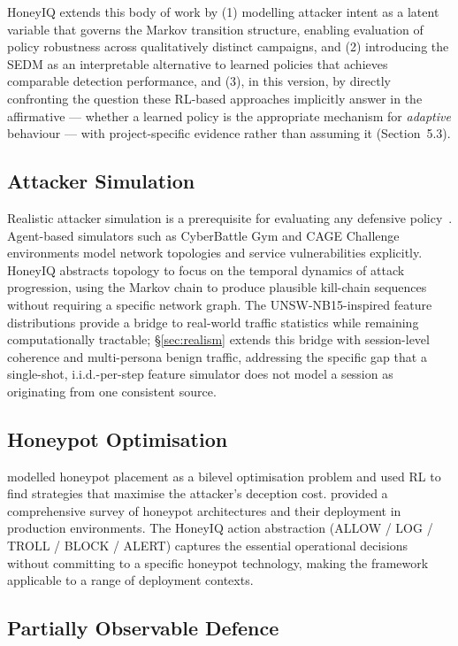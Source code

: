 HoneyIQ extends this body of work by (1) modelling attacker intent as a
latent variable that governs the Markov transition structure, enabling
evaluation of policy robustness across qualitatively distinct campaigns, and
(2) introducing the SEDM as an interpretable alternative to learned policies
that achieves comparable detection performance, and (3), in this version, by
directly confronting the question these RL-based approaches implicitly
answer in the affirmative --- whether a learned policy is the appropriate
mechanism for \emph{adaptive} behaviour --- with project-specific evidence
rather than assuming it (Section~5.3).

\subsection{Attacker Simulation}

Realistic attacker simulation is a prerequisite for evaluating any defensive
policy~\citep{applebaum2017cyber}.
Agent-based simulators such as CyberBattle Gym and CAGE Challenge environments
model network topologies and service vulnerabilities explicitly.
HoneyIQ abstracts topology to focus on the temporal dynamics of attack
progression, using the Markov chain to produce plausible kill-chain sequences
without requiring a specific network graph.
The UNSW-NB15-inspired feature distributions provide a bridge to real-world
traffic statistics while remaining computationally tractable;
\S\ref{sec:realism} extends this bridge with session-level coherence and
multi-persona benign traffic, addressing the specific gap that a
single-shot, i.i.d.-per-step feature simulator does not model a session as
originating from one consistent source.

\subsection{Honeypot Optimisation}

\citet{shi2021learning} modelled honeypot placement as a bilevel optimisation
problem and used RL to find strategies that maximise the attacker's deception
cost.
\citet{franco2021survey} provided a comprehensive survey of honeypot
architectures and their deployment in production environments.
The HoneyIQ action abstraction (ALLOW / LOG / TROLL / BLOCK / ALERT) captures
the essential operational decisions without committing to a specific honeypot
technology, making the framework applicable to a range of deployment contexts.

\subsection{Partially Observable Defence}

